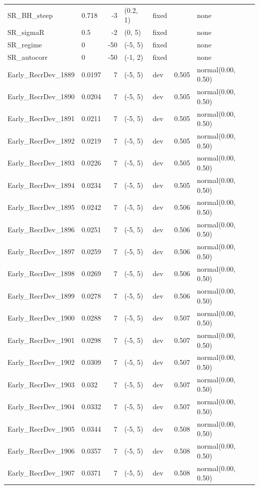 \documentclass[
]{scrartcl}
\begin{document}
\begin{longtable}{llrllrl}
SR\_BH\_steep & 0.718 & -3 & (0.2, 1) & fixed &  & none \\ 
SR\_sigmaR & 0.5 & -2 & (0, 5) & fixed &  & none \\ 
SR\_regime & 0 & -50 & (-5, 5) & fixed &  & none \\ 
SR\_autocorr & 0 & -50 & (-1, 2) & fixed &  & none \\ 
Early\_RecrDev\_1889 & 0.0197 & 7 & (-5, 5) & dev & 0.505 & normal(0.00, 0.50) \\ 
Early\_RecrDev\_1890 & 0.0204 & 7 & (-5, 5) & dev & 0.505 & normal(0.00, 0.50) \\ 
Early\_RecrDev\_1891 & 0.0211 & 7 & (-5, 5) & dev & 0.505 & normal(0.00, 0.50) \\ 
Early\_RecrDev\_1892 & 0.0219 & 7 & (-5, 5) & dev & 0.505 & normal(0.00, 0.50) \\ 
Early\_RecrDev\_1893 & 0.0226 & 7 & (-5, 5) & dev & 0.505 & normal(0.00, 0.50) \\ 
Early\_RecrDev\_1894 & 0.0234 & 7 & (-5, 5) & dev & 0.505 & normal(0.00, 0.50) \\ 
Early\_RecrDev\_1895 & 0.0242 & 7 & (-5, 5) & dev & 0.506 & normal(0.00, 0.50) \\ 
Early\_RecrDev\_1896 & 0.0251 & 7 & (-5, 5) & dev & 0.506 & normal(0.00, 0.50) \\ 
Early\_RecrDev\_1897 & 0.0259 & 7 & (-5, 5) & dev & 0.506 & normal(0.00, 0.50) \\ 
Early\_RecrDev\_1898 & 0.0269 & 7 & (-5, 5) & dev & 0.506 & normal(0.00, 0.50) \\ 
Early\_RecrDev\_1899 & 0.0278 & 7 & (-5, 5) & dev & 0.506 & normal(0.00, 0.50) \\ 
Early\_RecrDev\_1900 & 0.0288 & 7 & (-5, 5) & dev & 0.507 & normal(0.00, 0.50) \\ 
Early\_RecrDev\_1901 & 0.0298 & 7 & (-5, 5) & dev & 0.507 & normal(0.00, 0.50) \\ 
Early\_RecrDev\_1902 & 0.0309 & 7 & (-5, 5) & dev & 0.507 & normal(0.00, 0.50) \\ 
Early\_RecrDev\_1903 & 0.032 & 7 & (-5, 5) & dev & 0.507 & normal(0.00, 0.50) \\ 
Early\_RecrDev\_1904 & 0.0332 & 7 & (-5, 5) & dev & 0.507 & normal(0.00, 0.50) \\ 
Early\_RecrDev\_1905 & 0.0344 & 7 & (-5, 5) & dev & 0.508 & normal(0.00, 0.50) \\ 
Early\_RecrDev\_1906 & 0.0357 & 7 & (-5, 5) & dev & 0.508 & normal(0.00, 0.50) \\ 
Early\_RecrDev\_1907 & 0.0371 & 7 & (-5, 5) & dev & 0.508 & normal(0.00, 0.50) \\ 

\end{longtable}
\end{document}
